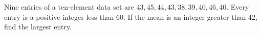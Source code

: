 Nine entries of a ten-element data set are $43,45,44,43,38,39,40,46,40$. Every entry is a positive integer less than 60. If the mean is an integer greater than 42, find the largest entry.
